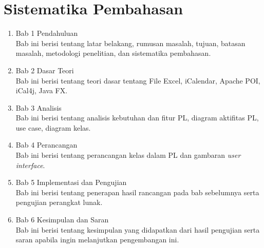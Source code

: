 \section{Sistematika Pembahasan}
\label{sec:sispem}
\begin{enumerate}
	\item Bab 1 Pendahuluan\\
	Bab ini berisi tentang latar belakang, rumusan masalah, tujuan, batasan masalah, metodologi penelitian, dan sistematika pembahasan.
	\item Bab 2 Dasar Teori\\
	Bab ini berisi tentang teori dasar tentang File Excel, iCalendar, Apache POI, iCal4j, Java FX.
	\item Bab 3 Analisis\\
	Bab ini berisi tentang analisis kebutuhan dan fitur PL, diagram aktifitas PL, use case, diagram kelas.
	\item Bab 4 Perancangan\\
	Bab ini berisi tentang perancangan kelas dalam PL dan gambaran \textit{user interface}.
	\item Bab 5 Implementasi dan Pengujian\\
	Bab ini berisi tentang penerapan hasil rancangan pada bab sebelumnya serta pengujian perangkat lunak.
	\item Bab 6 Kesimpulan dan Saran\\
	Bab ini berisi tentang kesimpulan yang didapatkan dari hasil pengujian serta saran apabila ingin melanjutkan pengembangan ini.
\end{enumerate}